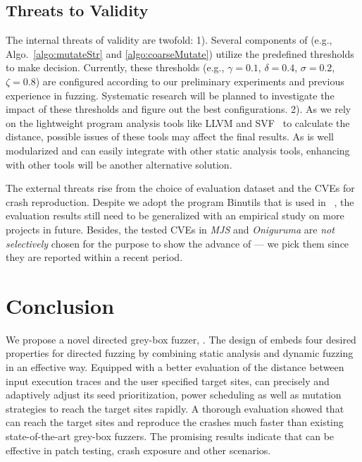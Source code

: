 \vspace{-2mm}  




\subsection{Threats to Validity}

The internal threats of validity are twofold:  1).  Several components of \dFOT (e.g., Algo.~\ref{algo:mutateStr} and \ref{algo:coarseMutate}) utilize  the predefined thresholds to make decision. Currently, these thresholds (e.g., $\gamma=0.1$, $\delta=0.4$, $\sigma=0.2$, $\zeta=0.8$) are configured according to our preliminary experiments and  previous experience in fuzzing. Systematic research will be planned to investigate the impact of these thresholds and figure out the best configurations. 
2). As we rely on the lightweight program analysis tools like LLVM and SVF~\cite{Sui:2016:SVF} to calculate the distance, possible issues of these tools may affect the final results.  As \dFOT is well modularized and can easily integrate with other static analysis tools, enhancing \dFOT with other tools will be another alternative solution. 

The external threats rise from the choice of evaluation dataset and the CVEs for crash reproduction. Despite we adopt the program Binutils that is used in \aflgo~\cite{Bohme:2017:DGF}, the evaluation results still need to be generalized with an empirical study on more projects in future. Besides, the tested CVEs in \emph{MJS} and  \emph{Oniguruma} are \emph{not selectively} chosen for the purpose to show the advance of \dFOT --- we pick them since they are reported within a recent period. 



%
 \section{Conclusion}
We propose a novel directed grey-box fuzzer, \dFOT.
The design of \dFOT embeds four desired properties for directed fuzzing by combining static analysis and dynamic fuzzing in an effective way.
Equipped with a better evaluation of the distance between input execution traces and the user specified target sites, \dFOT can precisely and adaptively adjust its seed prioritization, power scheduling as well as mutation strategies to reach the target sites rapidly.
A thorough evaluation showed that \dFOT can reach the target sites and reproduce the crashes much faster than existing state-of-the-art grey-box fuzzers.
The promising results indicate that \dFOT can be effective in patch testing, crash exposure and other scenarios. 